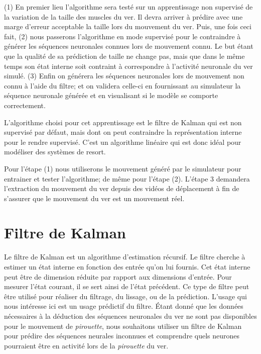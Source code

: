 (1) En premier lieu l'algorithme sera testé sur un apprentissage non supervisé
de la variation de la taille des muscles du ver.  Il devra arriver à prédire
avec une marge d'erreur acceptable la taille lors du mouvement du ver. Puis,
une fois ceci fait, (2) nous passerons l'algorithme en mode supervisé pour le
contraindre à générer les séquences neuronales connues lors de mouvement connu.
Le but étant que la qualité de sa prédiction de taille ne change pas, mais que
dans le même temps son état interne soit contraint à correspondre à l'activité
neuronale du ver simulé. (3) Enfin on générera les séquences neuronales lors de
mouvement non connu à l'aide du filtre; et on validera celle-ci en fournissant
au simulateur la séquence neuronale générée et en visualisant si le modèle se
comporte correctement.

L'algorithme choisi pour cet apprentissage est le filtre de Kalman qui est non
supervisé par défaut, mais dont on peut contraindre la représentation interne
pour le rendre supervisé. C'est un algorithme linéaire qui est donc idéal pour
modéliser des systèmes de resort.

Pour l'étape (1) nous utiliserons le mouvement généré par le simulateur pour
entrainer et tester l'algorithme; de même pour l'étape (2). L'étape 3
demandera l'extraction du mouvement du ver depuis des vidéos de déplacement à
fin de s'assurer que le mouvement du ver est un mouvement réel.


\section{Filtre de Kalman} %
\label{sec:Filtre de Kalman}

Le filtre de Kalman est un algorithme d'estimation récursif. Le filtre cherche
à estimer un état interne en fonction des entrée qu'on lui fournis. Cet état
interne peut être de dimension réduite par rapport aux dimensions d'entrée.
Pour mesurer l'état courant, il se sert ainsi de l'état précédent. Ce type de
filtre peut être utilisé pour réaliser du filtrage, du lissage, ou de la
prédiction.  L'usage qui nous intéresse ici est un usage prédictif du filtre.
Étant donné que les données nécessaires à la déduction des séquences neuronales
du ver ne sont pas disponibles pour le mouvement de \textit{pirouette}, nous
souhaitons utiliser un filtre de Kalman pour prédire des séquences neurales
inconnues et comprendre quels neurones pourraient être en activité lors de la
\textit{pirouette} du ver.

